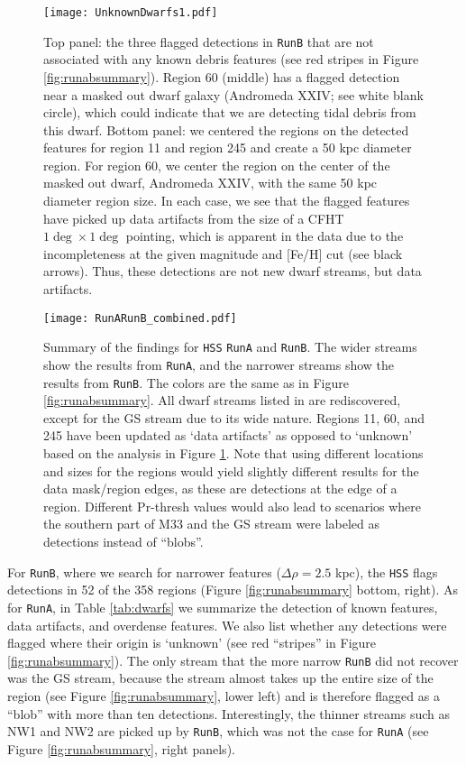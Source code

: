 \documentclass[twocolumn]{aastex631}
\begin{document}
\begin{figure}
\centerline{\texttt{[image: UnknownDwarfs1.pdf]}}
\caption{Top panel: the three flagged detections in \texttt{RunB} that are not associated with any known debris features (see red stripes in Figure \ref{fig:runabsummary}). Region 60 (middle) has a flagged detection near a masked out dwarf galaxy (Andromeda XXIV; see white blank circle), which could indicate that we are detecting tidal debris from this dwarf. Bottom panel: we centered the regions on the detected features for region 11 and region 245 and create a 50 kpc diameter region. For region 60, we center the region on the center of the masked out dwarf, Andromeda XXIV, with the same 50 kpc diameter region size. In each case, we see that the flagged features have picked up data artifacts from the size of a CFHT $1\deg \times1 \deg$ pointing, which is apparent in the data due to the incompleteness at the given magnitude and [Fe/H] cut (see black arrows). Thus, these detections are not new dwarf streams, but data artifacts. }
\label{fig:newdwarfstreams}
\end{figure}



\begin{figure}
\centerline{\texttt{[image: RunARunB\_combined.pdf]}}
\caption{Summary of the findings for \texttt{HSS} \texttt{RunA} and \texttt{RunB}. The wider streams show the results from \texttt{RunA}, and the narrower streams show the results from \texttt{RunB}. The colors are the same as in Figure \ref{fig:runabsummary}. All dwarf streams listed in \citet{McConnachie18} are rediscovered, except for the GS stream due to its wide nature. Regions 11, 60, and 245 have been updated as `data artifacts' as opposed to `unknown' based on the analysis in Figure \ref{fig:newdwarfstreams}. 
Note that using different locations and sizes for the regions would yield slightly different results for the data mask/region edges, as these are detections at the edge of a region. Different Pr-thresh values would also lead to scenarios where the southern part of M33 and the GS stream were labeled as detections instead of ``blobs''.}
\label{fig:dwarfscombined}
\end{figure}



For \texttt{RunB}, where we search for narrower features ($\Delta \rho = 2.5$ kpc), the \texttt{HSS} flags detections in 52 of the 358 regions (Figure \ref{fig:runabsummary} bottom, right).
As for \texttt{RunA}, in Table \ref{tab:dwarfs} we summarize the detection of known features, data artifacts, and
overdense features. We also list whether any detections were flagged where their origin is `unknown' (see red ``stripes'' in Figure \ref{fig:runabsummary}). 
The only stream that the more narrow \texttt{RunB} did not recover was the GS stream, because the stream almost takes up the entire size of the region (see Figure \ref{fig:runabsummary}, lower left) and is therefore flagged as a ``blob'' with more than ten detections. Interestingly, the thinner streams such as NW1 and NW2 are picked up by \texttt{RunB}, which was not the case for \texttt{RunA} (see Figure \ref{fig:runabsummary},  right panels). 
\end{document}
